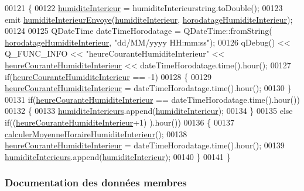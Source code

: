 \begin{DoxyCode}
00121 \{
00122     \hyperlink{class_infos_humidite_ad2847e671ad0b90f8dc0940dee107c38}{humiditeInterieur} = humiditeInterieurstring.toDouble();
00123     emit \hyperlink{class_infos_humidite_aa0eb7d8a609b837e1b450b7d79e1ff81}{humiditeInterieurEnvoye}(\hyperlink{class_infos_humidite_ad2847e671ad0b90f8dc0940dee107c38}{humiditeInterieur},
      \hyperlink{class_infos_humidite_a38712bac5a2d4d106a016647ad39fedf}{horodatageHumiditeInterieur});
00124 
00125     QDateTime dateTimeHorodatage = QDateTime::fromString(
      \hyperlink{class_infos_humidite_a38712bac5a2d4d106a016647ad39fedf}{horodatageHumiditeInterieur}, \textcolor{stringliteral}{"dd/MM/yyyy HH:mm:ss"});
00126     qDebug() << Q\_FUNC\_INFO << \textcolor{stringliteral}{"heureCouranteHumiditeInterieur"} << 
      \hyperlink{class_infos_humidite_a5a8597751ba0fe10a14a12e155421485}{heureCouranteHumiditeInterieur} << dateTimeHorodatage.time().hour();
00127     \textcolor{keywordflow}{if}(\hyperlink{class_infos_humidite_a5a8597751ba0fe10a14a12e155421485}{heureCouranteHumiditeInterieur} == -1)
00128     \{
00129         \hyperlink{class_infos_humidite_a5a8597751ba0fe10a14a12e155421485}{heureCouranteHumiditeInterieur} = dateTimeHorodatage.time().hour();
00130     \}
00131     \textcolor{keywordflow}{if}(\hyperlink{class_infos_humidite_a5a8597751ba0fe10a14a12e155421485}{heureCouranteHumiditeInterieur} == dateTimeHorodatage.time().hour())
00132     \{
00133         \hyperlink{class_infos_humidite_a2bcd5b3629a007078d4e15d110dae457}{humiditeInterieurs}.append(\hyperlink{class_infos_humidite_ad2847e671ad0b90f8dc0940dee107c38}{humiditeInterieur});
00134     \}
00135     \textcolor{keywordflow}{else} \textcolor{keywordflow}{if}((\hyperlink{class_infos_humidite_a5a8597751ba0fe10a14a12e155421485}{heureCouranteHumiditeInterieur}+1)%
      ).hour())
00136     \{
00137         \hyperlink{class_infos_humidite_acd903311f6c949f8f010b330f517e4f3}{calculerMoyenneHoraireHumiditeInterieur}();
00138         \hyperlink{class_infos_humidite_a5a8597751ba0fe10a14a12e155421485}{heureCouranteHumiditeInterieur} = dateTimeHorodatage.time().hour();
00139         \hyperlink{class_infos_humidite_a2bcd5b3629a007078d4e15d110dae457}{humiditeInterieurs}.append(\hyperlink{class_infos_humidite_ad2847e671ad0b90f8dc0940dee107c38}{humiditeInterieur});
00140     \}
00141 \}
\end{DoxyCode}


\subsubsection{Documentation des données membres}
\mbox{\label{class_infos_humidite_ad7b450373a47ec831872872e0e5674ad}} 
